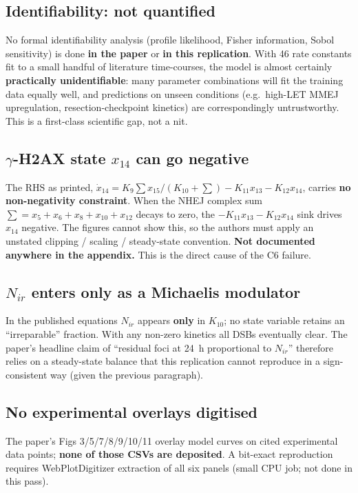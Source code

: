 \documentclass[11pt]{article}
\begin{document}
\subsection*{Identifiability: not quantified}

No formal identifiability analysis (profile likelihood, Fisher information,
Sobol sensitivity) is done \textbf{in the paper} or \textbf{in this replication}.
With 46 rate constants fit to a small handful of literature time-courses, the
model is almost certainly \textbf{practically unidentifiable}: many parameter
combinations will fit the training data equally well, and predictions on
unseen conditions (e.g.\ high-LET MMEJ upregulation, resection-checkpoint
kinetics) are correspondingly untrustworthy. This is a first-class scientific
gap, not a nit.

\subsection*{$\gamma$-H2AX state $x_{14}$ can go negative}

The RHS as printed,
$\dot{x}_{14}=K_9 \sum x_{15} / (K_{10}+\sum) - K_{11}x_{13} - K_{12}x_{14}$,
carries \textbf{no non-negativity constraint}. When the NHEJ complex sum
$\sum=x_5+x_6+x_8+x_{10}+x_{12}$ decays to zero, the $-K_{11}x_{13}-K_{12}x_{14}$
sink drives $x_{14}$ negative. The figures cannot show this, so the authors
must apply an unstated clipping / scaling / steady-state convention.
\textbf{Not documented anywhere in the appendix.} This is the direct cause
of the C6 failure.

\subsection*{$N_{ir}$ enters only as a Michaelis modulator}

In the published equations $N_{ir}$ appears \textbf{only} in $K_{10}$; no state
variable retains an ``irreparable'' fraction. With any non-zero kinetics
all DSBs eventually clear. The paper's headline claim of ``residual foci at 24~h
proportional to $N_{ir}$'' therefore relies on a steady-state balance that
this replication cannot reproduce in a sign-consistent way (given the previous
paragraph).

\subsection*{No experimental overlays digitised}

The paper's Figs 3/5/7/8/9/10/11 overlay model curves on cited experimental data
points; \textbf{none of those CSVs are deposited}. A bit-exact reproduction
requires WebPlotDigitizer extraction of all six panels (small CPU job; not
done in this pass).
\end{document}
